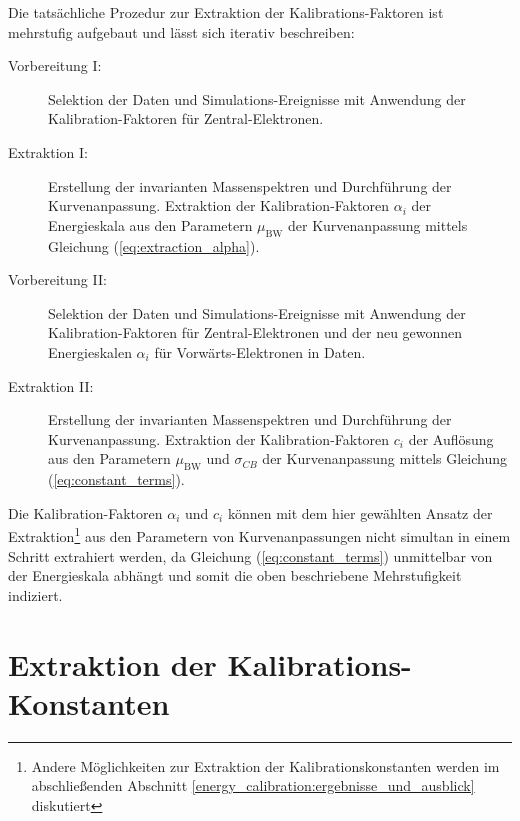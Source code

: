 Die tatsächliche Prozedur zur Extraktion der Kalibrations-Faktoren ist
mehrstufig aufgebaut und lässt sich iterativ beschreiben:
\begin{description}
    \item[Vorbereitung I:]
        Selektion der Daten und Simulations-Ereignisse mit Anwendung der
        Kalibration-Faktoren für Zentral-Elektronen.
    \item[Extraktion I:]
        Erstellung der invarianten Massenspektren und Durchführung der
        Kurvenanpassung. Extraktion der Kalibration-Faktoren $\alpha_i$ der
        Energieskala aus den Parametern $\mu_\text{BW}$ der Kurvenanpassung
        mittels Gleichung (\ref{eq:extraction_alpha}).
    \item[Vorbereitung II:]
        Selektion der Daten und Simulations-Ereignisse mit Anwendung der
        Kalibration-Faktoren für Zentral-Elektronen und der neu gewonnen
        Energieskalen $\alpha_i$ für Vorwärts-Elektronen in Daten.
    \item[Extraktion II:]
        Erstellung der invarianten Massenspektren und Durchführung der
        Kurvenanpassung. Extraktion der Kalibration-Faktoren $c_i$ der
        Auflösung aus den Parametern $\mu_\text{BW}$ und $\sigma_{CB}$ der
        Kurvenanpassung mittels Gleichung (\ref{eq:constant_terms}).
\end{description}
Die Kalibration-Faktoren $\alpha_i$ und $c_i$ können mit dem hier gewählten
Ansatz der Extraktion\footnote{Andere Möglichkeiten zur Extraktion der
Kalibrationskonstanten werden im abschließenden Abschnitt
\ref{energy_calibration:ergebnisse_und_ausblick} diskutiert} aus den Parametern
von Kurvenanpassungen nicht simultan in einem Schritt extrahiert werden, da
Gleichung (\ref{eq:constant_terms}) unmittelbar von der Energieskala abhängt
und somit die oben beschriebene Mehrstufigkeit indiziert.



%
\section{Extraktion der Kalibrations-Konstanten}
\label{energy_calibration:extraktion_der_kalibrations-konstanten}


